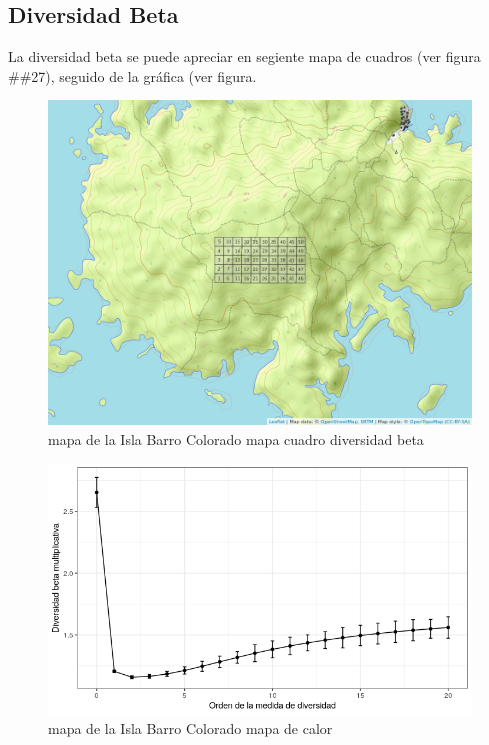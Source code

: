 \documentclass[11pt,]{article}
\begin{document}
\subsection{Diversidad Beta}\label{diversidad-beta}

La diversidad beta se puede apreciar en segiente mapa de cuadros (ver
figura \#\#27), seguido de la gráfica (ver figura.

\begin{figure}
\centering
\includegraphics[width=1.00000\textwidth]{mapa_cuadros.png}
\caption{mapa de la Isla Barro Colorado mapa cuadro diversidad beta
\label{fig:bci_map}}
\end{figure}

\begin{figure}
\centering
\includegraphics[width=1.00000\textwidth]{diversidad_beta.png}
\caption{mapa de la Isla Barro Colorado mapa de calor
\label{fig:bci_map}}
\end{figure}
\end{document}
